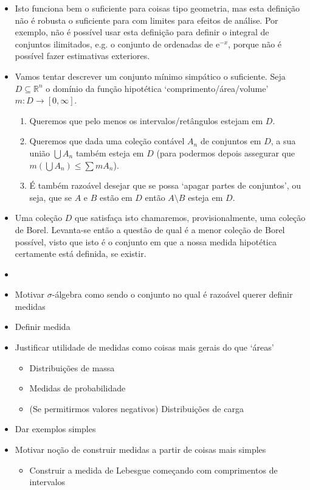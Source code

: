 \documentclass{article}
\newcommand{\R}{\mathbb{R}}
\newcommand{\e}{\mathrm{e}}
\begin{document}
\begin{itemize}
\item Isto funciona bem o suficiente para coisas tipo geometria, mas esta definição não é robusta o suficiente para com limites para efeitos de análise. Por exemplo, não é possível usar esta definição para definir o integral de conjuntos ilimitados, e.g. o conjunto de ordenadas de $\e^{-x}$, porque não é possível fazer estimativas exteriores.
\item Vamos tentar descrever um conjunto mínimo simpático o suficiente. Seja $D \subseteq \R^n$ o domínio da função hipotética `comprimento/área/volume' $m : D \to \left[0,\infty\right]$.
\begin{enumerate}
\item Queremos que pelo menos os intervalos/retângulos estejam em $D$.
\item Queremos que dada uma coleção contável $A_n$ de conjuntos em $D$, a sua união $\bigcup A_n$ também esteja em $D$ (para podermos depois assegurar que $m(\bigcup A_n) \leq \sum m A_n$).
\item É também razoável desejar que se possa `apagar partes de conjuntos', ou seja, que se $A$ e $B$ estão em $D$ então $A \setminus B$ esteja em $D$.
\end{enumerate}
\item Uma coleção $D$ que satisfaça isto chamaremos, provisionalmente, uma coleção de Borel. Levanta-se então a questão de qual é a menor coleção de Borel possível, visto que isto é o conjunto em que a nossa medida hipotética certamente está definida, se existir.
\item 
\item Motivar $\sigma$-álgebra como sendo o conjunto no qual é razoável querer definir medidas
\item Definir medida
\item Justificar utilidade de medidas como coisas mais gerais do que `áreas'
\begin{itemize}
\item Distribuições de massa
\item Medidas de probabilidade
\item (Se permitirmos valores negativos) Distribuições de carga
\end{itemize}
\item Dar exemplos simples
\item Motivar noção de construir medidas a partir de coisas mais simples
\begin{itemize}
\item Construir a medida de Lebesgue começando com comprimentos de intervalos

\end{itemize}
\end{itemize}
\end{document}
